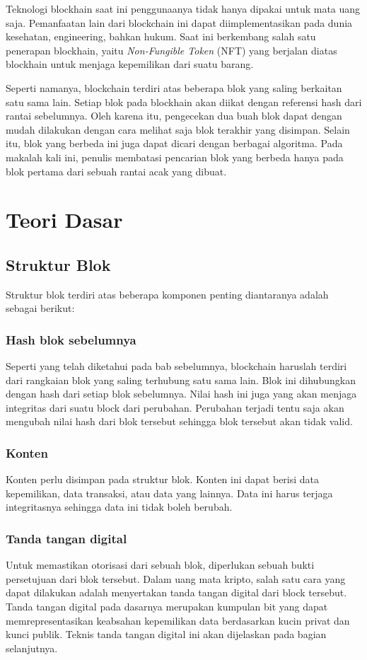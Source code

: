 \documentclass[10pt,conference]{IEEEtran}
\theoremstyle{definition}
\begin{document}
Teknologi blockhain saat ini penggunaanya tidak hanya dipakai untuk mata uang saja. Pemanfaatan lain dari blockchain ini dapat diimplementasikan pada dunia kesehatan, engineering, bahkan hukum. Saat ini berkembang salah satu penerapan blockhain, yaitu \emph{Non-Fungible Token} (NFT) yang berjalan diatas blockhain untuk menjaga kepemilikan dari suatu barang.

Seperti namanya, blockchain terdiri atas beberapa blok yang saling berkaitan satu sama lain. Setiap blok pada blockhain akan diikat dengan referensi hash dari rantai sebelumnya. Oleh karena itu, pengecekan dua buah blok dapat dengan mudah dilakukan dengan cara melihat saja blok terakhir yang disimpan. Selain itu, blok yang  berbeda ini juga dapat dicari dengan berbagai algoritma. Pada makalah kali ini, penulis membatasi pencarian blok yang berbeda hanya pada blok pertama dari sebuah rantai acak yang dibuat.

\section{Teori Dasar}
\subsection{Struktur Blok}
Struktur blok terdiri atas beberapa komponen penting diantaranya adalah sebagai berikut:


    \subsubsection{Hash blok sebelumnya}
    Seperti yang telah diketahui pada bab sebelumnya, blockchain haruslah terdiri dari rangkaian blok yang saling terhubung satu sama lain. Blok ini dihubungkan dengan hash dari setiap blok sebelumnya. Nilai hash ini juga yang akan menjaga integritas dari suatu block dari perubahan. Perubahan terjadi tentu saja akan mengubah nilai hash dari blok tersebut sehingga blok tersebut akan tidak valid.

    \subsubsection{Konten}
    Konten perlu disimpan pada struktur blok. Konten ini dapat berisi data kepemilikan, data transaksi, atau data yang lainnya. Data ini harus terjaga integritasnya sehingga data ini tidak boleh berubah. 

    \subsubsection{Tanda tangan digital} 
    Untuk memastikan otorisasi dari sebuah blok, diperlukan sebuah bukti persetujuan dari blok tersebut. Dalam uang mata kripto, salah satu cara yang dapat dilakukan adalah menyertakan tanda tangan digital dari block tersebut. Tanda tangan digital pada dasarnya merupakan kumpulan bit yang dapat memrepresentasikan keabsahan kepemilikan data berdasarkan kucin privat dan kunci publik. Teknis tanda tangan digital ini akan dijelaskan pada bagian selanjutnya.
\end{document}
